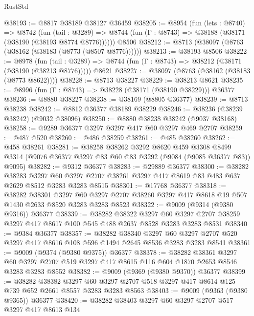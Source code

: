 \begin{lexlean}{RustStd}
\begin{coremodule}
@38193 := @8817 @38189 @38127 @36459
@38205 := @8954
    (fun (lets : @8740) =>
    @8742
      (fun (tail : @3289) =>
      @8744 (fun (Γ : @8743) => @38188 (@38171 (@38190 (@38193 @8774 @8776))))))
    @8506
@38212 := @8713 (@38097 (@8763 (@38162 (@38183 (@8773 (@8507 @8776))))))
@38213 := @38193 @8506
@38222 := @8978
    (fun (tail : @3289) => @8744 (fun (Γ : @8743) => @38212 (@38171 (@38190 (@38213 @8776)))))
    @8621
@38227 := @38097 (@8763 (@38162 (@38183 (@8773 @8622))))
@38228 := @8713 @38227
@38229 := @38213 @8621
@38235 := @8996 (fun (Γ : @8743) => @38228 (@38171 (@38190 @38229))) @36377
@38236 := @8880 @38227
@38238 := @38169 (@8805 @36377)
@38239 := @8713 @38238
@38242 := @8812 @36377 @38189 @38229
@38246 := @38236 (@38239 @38242) (@9032 @38096)
@38250 := @8880 @38238 @38242 (@9037 @38168)
@38258 := @9289 @36377 @3297 @3297 @417 @60 @3297 @469 @2707
@38259 := @487 @520
@38260 := @486 @38259
@38261 := @485 @38260
@38262 := @458 @38261
@38281 := @38258
    @38262
    @3292
    @8620
    @459
    @3308
    @8499
    @3314
    (@9076 @36377 @3297 @83 @60 @83 @3292 (@9084 (@9085 @36377 @83)) @9095)
@38282 := @9312 @36377
@38283 := @29889 @36377
@38300 := @38282
    @38283
    @3297
    @60
    @3297
    @2707
    @38261
    @3297
    @417
    @8619
    @83
    @483
    @637
    @2629
    @8512
    @3283
    @3283
    @8515
@38301 := @17768 @36377
@38318 := @38282
    @38301
    @3297
    @60
    @3297
    @2707
    @38260
    @3297
    @417
    @8618
    @19
    @507
    @1430
    @2633
    @8520
    @3283
    @3283
    @8523
@38322 := @9009 (@9314 (@9380 @9316)) @36377
@38339 := @38282
    @38322
    @3297
    @60
    @3297
    @2707
    @38259
    @3297
    @417
    @8617
    @100
    @545
    @488
    @2637
    @8528
    @3283
    @3283
    @8531
@38340 := @9384 @36377
@38357 := @38282
    @38340
    @3297
    @60
    @3297
    @2707
    @520
    @3297
    @417
    @8616
    @108
    @596
    @1494
    @2645
    @8536
    @3283
    @3283
    @8541
@38361 := @9009 (@9374 (@9380 @9375)) @36377
@38378 := @38282
    @38361
    @3297
    @60
    @3297
    @2707
    @519
    @3297
    @417
    @8615
    @116
    @604
    @1870
    @2653
    @8546
    @3283
    @3283
    @8552
@38382 := @9009 (@9369 (@9380 @9370)) @36377
@38399 := @38282
    @38382
    @3297
    @60
    @3297
    @2707
    @518
    @3297
    @417
    @8614
    @125
    @739
    @652
    @2661
    @8557
    @3283
    @3283
    @8563
@38403 := @9009 (@9363 (@9380 @9365)) @36377
@38420 := @38282
    @38403
    @3297
    @60
    @3297
    @2707
    @517
    @3297
    @417
    @8613
    @134

\end{coremodule}
\end{lexlean}
